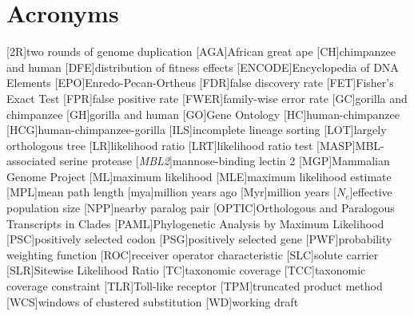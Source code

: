 \section*{Acronyms}
\label{Acronyms}
\begin{acronym}[TDMA]

[2R]{two rounds of genome duplication}
[AGA]{African great ape}
[CH]{chimpanzee and human}
[DFE]{distribution of fitness effects}
[ENCODE]{Encyclopedia of DNA Elements}
[EPO]{Enredo-Pecan-Ortheus}
[FDR]{false discovery rate}
[FET]{Fisher's Exact Test}
[FPR]{false positive rate}
[FWER]{family-wise error rate}
[GC]{gorilla and chimpanzee}
[GH]{gorilla and human}
[GO]{Gene Ontology}
[HC]{human-chimpanzee}
[HCG]{human-chimpanzee-gorilla}
[ILS]{incomplete lineage sorting}
[LOT]{largely orthologous tree}
[LR]{likelihood ratio}
[LRT]{likelihood ratio test}
[MASP]{MBL-associated serine protease}
[\emph{MBL2}]{mannose-binding lectin 2}
[MGP]{Mammalian Genome Project}
[ML]{maximum likelihood}
[MLE]{maximum likelihood estimate}
[MPL]{mean path length}
[mya]{million years ago}
[Myr]{million years}
[$N_{e}$]{effective population size}
[NPP]{nearby paralog pair}
[OPTIC]{Orthologous and Paralogous Transcripts in Clades}
[PAML]{Phylogenetic Analysis by Maximum Likelihood}
[PSC]{positively selected codon}
[PSG]{positively selected gene}
[PWF]{probability weighting function}
[ROC]{receiver operator characteristic}
[SLC]{solute carrier}
[SLR]{Sitewise Likelihood Ratio}
[TC]{taxonomic coverage}
[TCC]{taxonomic coverage constraint}
[TLR]{Toll-like receptor}
[TPM]{truncated product method}
[WCS]{windows of clustered substitution}
[WD]{working draft}

\end{acronym}
